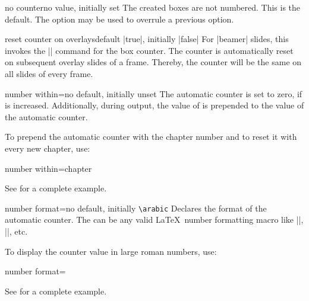 \begin{newTcbKey}{no counter}{}{no value, initially set}
The created boxes are not numbered. This is the default. The option may
be used to overrule a previous option.
\end{newTcbKey}

\enlargethispage*{1cm}

\begin{newTcbKey}[][doc new=2019-10-18]{reset counter on overlays}{}{default |true|, initially |false|}
For |beamer| slides, this invokes the |\resetcounteronoverlays| command
for the box counter. The counter is automatically reset on subsequent
overlay slides of a frame.
Thereby, the counter will be the same on all slides of every frame.
\end{newTcbKey}


\clearpage
\begin{newTcbKey}{number within}{=}{no default, initially unset}
The automatic counter is set to zero, if  is increased.
Additionally, during output, the value of  is prepended to the value of
the automatic counter.\par
To prepend the automatic counter with the chapter number and to reset it
with every new chapter, use:
\begin{dispListing}
number within=chapter
\end{dispListing}
See  for a complete example.
\end{newTcbKey}


\begin{newTcbKey}{number format}{=}{no default, initially \texttt{\textbackslash arabic}}
Declares the format of the automatic counter. The  can be
any valid \LaTeX\ number formatting macro like |\arabic|, |\roman|, etc.\par
To display the counter value in large roman numbers, use:
\begin{dispListing}
number format=\Roman
\end{dispListing}
See  for a complete example.
\end{newTcbKey}


